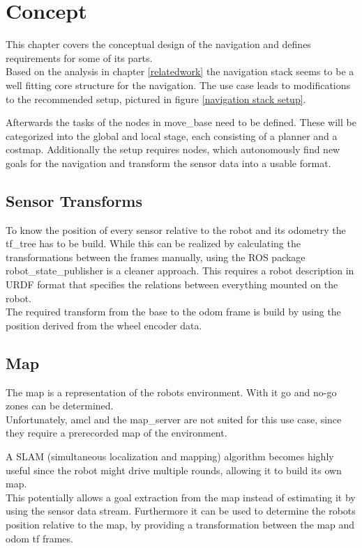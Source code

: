 \chapter{Concept}
\label{Concept}

This chapter covers the conceptual design of the navigation and defines requirements for some of its parts.\\

Based on the analysis in chapter \ref{relatedwork} the navigation stack seems to be a well fitting core structure for the navigation. The use case leads to modifications to the recommended setup, pictured in figure \ref{navigation stack setup}.

Afterwards the tasks of the nodes in move\_base need to be defined. These will be categorized into the global and local stage, each consisting of a planner and a costmap.
Additionally the setup requires nodes, which autonomously find new goals for the navigation and transform the sensor data into a usable format. 

\section{Sensor Transforms}
To know the position of every sensor relative to the robot and its odometry the tf\_tree has to be build. While this can be realized by calculating the transformations between the frames manually,  using the ROS package robot\_state\_publisher is a cleaner approach. This requires a robot description in URDF format that specifies the relations between everything mounted on the robot.\\

The required transform from the base to the odom frame is build by using the position derived from the wheel encoder data.

\section{Map}

The map is a representation of the robots environment. With it go and no-go zones can be determined.\\

Unfortunately, amcl and the map\_server are not suited for this use case, since they require a prerecorded map of the environment. 

A SLAM (simultaneous localization and mapping) algorithm becomes highly useful since the robot might drive multiple rounds, allowing it to build its own map.\\
This potentially allows a goal extraction from the map instead of estimating it by using the sensor data stream. Furthermore it can be used to determine the robots position relative to the map, by providing a transformation between the map and odom tf frames.

